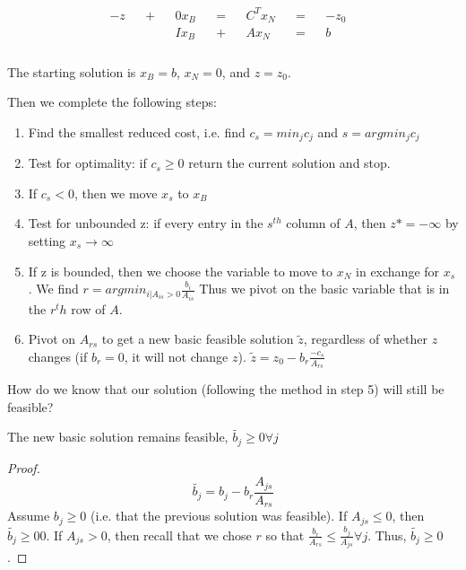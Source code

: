 \begin{eqnarray}
\begin{aligned}
-z && + && 0x_B && = && C^Tx_N && = &&-z_0 \\
&&&&Ix_B && + && Ax_N &&=&& b &\\
\end{aligned}
\end{eqnarray}

The starting solution is $x_B = b$, $x_N = 0$, and $z = z_0$.

Then we complete the following steps:

\begin{enumerate}
\item
Find the smallest reduced cost, i.e. find $c_s = min_jc_j$ and $s = argmin_j c_j$
\item
Test for optimality: if $c_s \geq 0$ return the current solution and stop.
\item
If $c_s < 0$, then we move $x_s$ to $x_B$
\item
Test for unbounded z: if every entry in the $s^{th}$ column of $A$, then $z* = -\infty$ by setting $x_s \to \infty$
\item
If z is bounded, then we choose the variable to move to $x_N$ in exchange for $x_s$.  We find $r = argmin_{i|A_{is} > 0} \frac{b_i}{A_{is}}$  Thus we pivot on the basic variable that is in the $r^th$ row of $A$.
\item
Pivot on $A_{rs}$ to get a new basic feasible solution $\tilde{z}$, regardless of whether $z$ changes (if $b_r = 0$, it will not change $z$). $\tilde{z} = z_0 - b_r\frac{-c_s}{A_{rs}}$
\end{enumerate}

How do we know that our solution (following the method in step 5) will still be feasible?

\begin{lemma} The new basic solution remains feasible, $\tilde{b_j} \geq 0 \forall j$ \end{lemma}
\begin{proof}
\begin{equation}
\tilde{b_j} = b_j - b_r\frac{A_{js}}{A_{rs}}
\end{equation}
Assume $b_j \geq 0$ (i.e. that the previous solution was feasible). If $A_{js} \leq 0$, then $\tilde{b_j} \geq 0 0$. If $A_{js} > 0$, then recall that we chose $r$ so that $\frac{b_r}{A_{rs}} \leq \frac{b_j}{A_{js}} \forall j$.  Thus, $\tilde{b_j} \geq 0$.
\end{proof}

